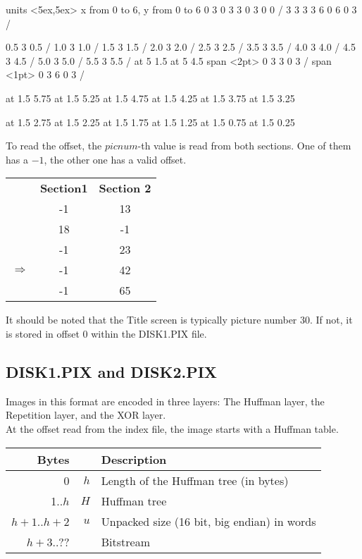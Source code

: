 \documentclass[11pt,twoside,openright]{report}
\begin{document}
\beginpicture
\setcoordinatesystem units <5ex,5ex>
\setplotarea x from 0 to 6, y from 0 to 6
 0  3 0 3 3 0 3 0 0 /
 3  3 3 3 6 0 6 0 3 /

 0.5 3 0.5 /
 1.0 3 1.0 /
 1.5 3 1.5 /
 2.0 3 2.0 /
 2.5 3 2.5 /
 3.5 3 3.5 /
 4.0 3 4.0 /
 4.5 3 4.5 /
 5.0 3 5.0 /
 5.5 3 5.5 /
 at 5 1.5
 at 5 4.5
\setshadegrid span <2pt>
 0 3  3 0 3 /
\setshadegrid span <1pt>
 0 3  6 0 3 /

 at 1.5 5.75
 at 1.5 5.25
 at 1.5 4.75
 at 1.5 4.25
 at 1.5 3.75
 at 1.5 3.25

 at 1.5 2.75
 at 1.5 2.25
 at 1.5 1.75
 at 1.5 1.25
 at 1.5 0.75
 at 1.5 0.25
\endpicture


To read the offset, the $picnum$-th value is read from both sections. One of them has a $-1$, the other one has a valid offset.\\
\begin{tabular}{l@{$\;\;\;$}cc}
&{\bf Section1}&{\bf Section 2}\\
&-1&13\\
&18&-1\\
&-1&23\\
$\Rightarrow$&-1&42\\
&-1&65\\
\end{tabular}

It should be noted that the Title screen is typically picture number 30. If not, it is stored in offset 0 within the DISK1.PIX file.

\subsection{DISK1.PIX and DISK2.PIX}
Images in this format are encoded in three layers: The Huffman layer, the Repetition layer, and the XOR layer.\\
At the offset read from the index file, the image starts with a Huffman table. 

\begin{tabular}{r|rl}
Bytes&&Description\\\hline
0&$h$&Length of the Huffman tree (in bytes)\\
1..$h$&$H$&Huffman tree\\
$h+1$..$h+2$&$u$&Unpacked size (16 bit, big endian) in words\\
$h+3$..??&&Bitstream\\
\end{tabular}
\end{document}
